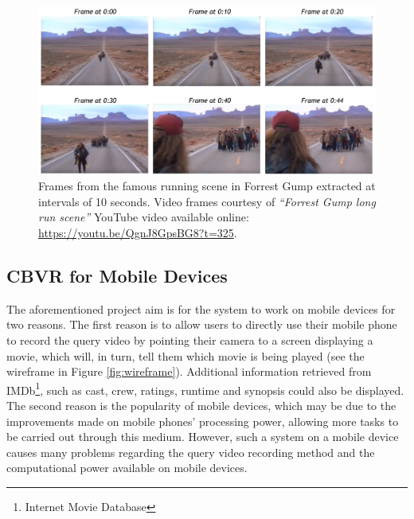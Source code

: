 \begin{figure}[h]
\centerline{\includegraphics[width=\textwidth]{figures/litsurvey/forrest_gump_shot.jpg}}
\caption{\label{fig:forrest_gump_frames}Frames from the famous running scene in Forrest Gump extracted at intervals of 10 seconds. Video frames courtesy of \textit{``Forrest Gump long run scene''} YouTube video available online: \url{https://youtu.be/QgnJ8GpsBG8?t=325}.}
\end{figure}

\subsection{CBVR for Mobile Devices}
\label{sec:litsurvey-cbvr-4-mobile-devices}

The aforementioned project aim is for the system to work on mobile devices for two reasons. The first reason is to allow users to directly use their mobile phone to record the query video by pointing their camera to a screen displaying a movie, which will, in turn, tell them which movie is being played (see the wireframe in Figure \ref{fig:wireframe}). Additional information retrieved from IMDb\footnote{Internet Movie Database}, such as cast, crew, ratings, runtime and synopsis could also be displayed. The second reason is the popularity of mobile devices, which may be due to the improvements made on mobile phones' processing power, allowing more tasks to be carried out through this medium. However, such a system on a mobile device causes many problems regarding the query video recording method and the computational power available on mobile devices.\\

